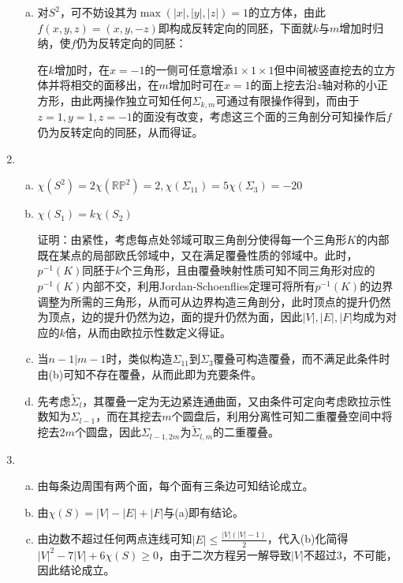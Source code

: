 \documentclass[a4paper,UTF8,fontset=windows]{ctexart}
\begin{document}
\begin{enumerate}[(1)]
\begin{enumerate}[(a)]
    \item
    对$S^2$，可不妨设其为$\max(|x|,|y|,|z|)=1$的立方体，由此$f(x,y,z)=(x,y,-z)$即构成反转定向的同胚，下面就$k$与$m$增加时归纳，使$f$仍为反转定向的同胚：
    
    在$k$增加时，在$x=-1$的一侧可任意增添$1\times1\times1$但中间被竖直挖去的立方体并将相交的面移出，在$m$增加时可在$x=1$的面上挖去沿$z$轴对称的小正方形，由此两操作独立可知任何$\Sigma_{k,m}$可通过有限操作得到，而由于$z=1,y=1,z=-1$的面没有改变，考虑这三个面的三角剖分可知操作后$f$仍为反转定向的同胚，从而得证。
    \end{enumerate}
    
    \item
    \begin{enumerate}[(a)]
    \item
    $\chi(S^2)=2\chi(\mathbb{RP}^2)=2,\chi(\Sigma_{11})=5\chi(\Sigma_3)=-20$
    
    \item
    $\chi(S_1)=k\chi(S_2)$
    
    证明：由紧性，考虑每点处邻域可取三角剖分使得每一个三角形$K$的内部既在某点的局部欧氏邻域中，又在满足覆叠性质的邻域中。此时，$p^{-1}(K)$同胚于$k$个三角形，且由覆叠映射性质可知不同三角形对应的$p^{-1}(K)$内部不交，利用Jordan-Schoenflies定理可将所有$p^{-1}(K)$的边界调整为所需的三角形，从而可从边界构造三角剖分，此时顶点的提升仍然为顶点，边的提升仍然为边，面的提升仍然为面，因此$|V|,|E|,|F|$均成为对应的$k$倍，从而由欧拉示性数定义得证。
    
    \item
    当$n-1|m-1$时，类似构造$\Sigma_{11}$到$\Sigma_3$覆叠可构造覆叠，而不满足此条件时由(b)可知不存在覆叠，从而此即为充要条件。
    
    \item
    先考虑$\widetilde{\Sigma}_l$，其覆叠一定为无边紧连通曲面，又由条件可定向考虑欧拉示性数知为$\Sigma_{l-1}$，而在其挖去$m$个圆盘后，利用分离性可知二重覆叠空间中将挖去$2m$个圆盘，因此$\Sigma_{l-1,2m}$为$\widetilde{\Sigma}_{l,m}$的二重覆叠。
    \end{enumerate}
    
    \item
    \begin{enumerate}[(a)]
    \item
    由每条边周围有两个面，每个面有三条边可知结论成立。
    
    \item
    由$\chi(S)=|V|-|E|+|F|$与(a)即有结论。
    
    \item
    由边数不超过任何两点连线可知$|E|\le\frac{|V|(|V|-1)}{2}$，代入(b)化简得$|V|^2-7|V|+6\chi(S)\ge0$，由于二次方程另一解导致$|V|$不超过3，不可能，因此结论成立。
    \end{enumerate}
\end{enumerate}
\end{document}
